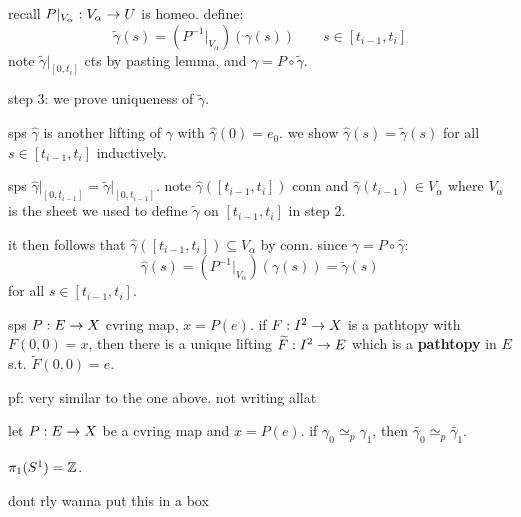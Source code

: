 \begin{pf}[source=Primary Source Material]
\begin{block}
        recall $P\rvert_{V_{\alpha}}:V_{\alpha}\rightarrow U$ is homeo. define:
        \begin{equation*}
            \tilde{\gamma}(s) = \left( P^{-1}\rvert_{V_{\alpha}} \right)(\gamma(s)) \qquad
            s \in [t_{i-1},t_{i}]
        \end{equation*}
        note $\tilde{\gamma}\rvert_{[0,t_{i}]}$ cts by pasting lemma, and
        $\gamma=P\circ\tilde{\gamma}$.
    \end{block}
    step 3: we prove uniqueness of $\tilde{\gamma}$.
    \begin{block}
        sps $\hat{\gamma}$ is another lifting of $\gamma$ with $\hat{\gamma}(0)=e_{0}$.
        we show $\hat{\gamma}(s)=\tilde{\gamma}(s)$ for all $s \in[t_{i-1},t_{i}]$ inductively.

        sps $\hat{\gamma}\rvert_{[0,t_{i-1}]}=\tilde{\gamma}\rvert_{[0,t_{i-1}]}$.
        note $\hat{\gamma}([t_{i-1},t_{i}])$ conn and $\hat{\gamma}(t_{i-1})\in V_{\alpha}$
        where $V_{\alpha}$ is the sheet we used to define $\tilde{\gamma}$ on $[t_{i-1},t_{i}]$ in
        step 2.

        it then follows that $\hat{\gamma}([t_{i-1},t_{i}])\subseteq V_{\alpha}$ by conn.
        since $\gamma=P\circ\hat{\gamma}$:
        \begin{equation*}
            \hat{\gamma}(s)=\left(P^{-1}\rvert_{V_{\alpha}}\right)(\gamma(s)) = \tilde{\gamma}(s)
        \end{equation*}
        for all $s \in[t_{i-1},t_{i}]$.
    \end{block}
\end{pf}

\newpage
\begin{lm}[title=Path-homotopy lifting property]
    sps $P:E\rightarrow X$ cvring map, $x=P(e)$.
    if $F:I^{2}\rightarrow X$ is a pathtopy with $F(0,0)=x$, then there is
    a unique lifting $\widetilde{F}:I^{2}\rightarrow E$ which is a \textbf{pathtopy} in $E$ s.t.
    $\tilde{F}(0,0)=e$.
\end{lm}
pf: very similar to the one above. not writing allat

\begin{crll}
    let $P:E\rightarrow X$ be a cvring map and $x=P(e)$.
    if $\gamma_{0}\simeq_{p}\gamma_{1}$, then $\tilde{\gamma_{0}}\simeq_{p}\tilde{\gamma_{1}}$.
\end{crll}

\begin{thm}
    $\pi_{1}(S^{1})=\mathbb{Z}$.
\end{thm}
dont rly wanna put this in a box

